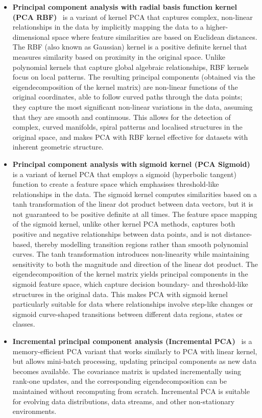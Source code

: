 \begin{itemize}
    \item \textbf{Principal component analysis with radial basis function kernel (PCA RBF)}~\citep{SchEtAl97} is a variant of kernel PCA that captures complex, non-linear relationships in the data by implicitly mapping the data to a higher-dimensional space where feature similarities are based on Euclidean distances. The RBF (also known as Gaussian) kernel is a positive definite kernel that measures similarity based on proximity in the original space. Unlike polynomial kernels that capture global algebraic relationships, RBF kernels focus on local patterns. The resulting principal components (obtained via the eigendecomposition of the kernel matrix) are non-linear functions of the original coordinates, able to follow curved paths through the data points; they capture the most significant non-linear variations in the data, assuming that they are smooth and continuous. This allows for the detection of complex, curved manifolds, spiral patterns and localised structures in the original space, and makes PCA with RBF kernel effective for datasets with inherent geometric structure. 
    \item \textbf{Principal component analysis with sigmoid kernel (PCA Sigmoid)}~\citep{SchEtAl97} is a variant of kernel PCA that employs a sigmoid (hyperbolic tangent) function to create a feature space which emphasises threshold-like relationships in the data. The sigmoid kernel computes similarities based on a tanh transformation of the linear dot product between data vectors, but it is not guaranteed to be positive definite at all times. The feature space mapping of the sigmoid kernel, unlike other kernel PCA methods, captures both positive and negative relationships between data points, and is not distance-based, thereby modelling transition regions rather than smooth polynomial curves. 
    The tanh transformation introduces non-linearity while maintaining sensitivity to both the magnitude and direction of the linear dot product. The eigendecomposition of the kernel matrix yields principal components in the sigmoid feature space, which capture decision boundary- and threshold-like structures in the original data. This makes PCA with sigmoid kernel particularly suitable for data where relationships involve step-like changes or sigmoid curve-shaped transitions between different data regions, states or classes.
    \item \textbf{Incremental principal component analysis (Incremental PCA)}~\citep{RosEtAl08} is a memory-efficient PCA variant that works similarly to PCA with linear kernel, but allows mini-batch processing, updating principal components as new data becomes available. The covariance matrix is updated incrementally using rank-one updates, and the corresponding eigendecomposition can be maintained without recomputing from scratch. Incremental PCA is suitable for evolving data distributions, data streams, and other non-stationary environments.


\end{itemize}
